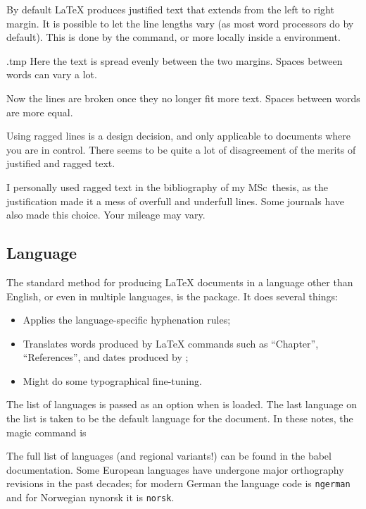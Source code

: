 By default \LaTeX{} produces justified text that extends from the left to right margin.
It is possible to let the line lengths vary (as most word processors do by default).
This is done by the  command,
or more locally inside a  environment.
%
\begin{VerbatimOut}{\jobname.tmp}
Here the text is spread evenly
between the two margins.
Spaces between words can vary a lot.\\

\raggedright

Now the lines are broken
once they no longer fit more text.
Spaces between words are more equal.
\end{VerbatimOut}
\ShowExample
%
Using ragged lines is a design decision,
and only applicable to documents where you are in control.
There seems to be quite a lot of disagreement of the merits of justified and ragged text.

I personally used ragged text in the bibliography of my MSc~thesis,
as the justification made it a mess of overfull and underfull lines.
Some journals have also made this choice.
Your mileage may vary.



%
%
\subsection{Language}

The standard method for producing \LaTeX{} documents in a language other than English,
or even in multiple languages, is the  package.
It does several things:
\begin{itemize}
    \item Applies the language-specific hyphenation rules;
    \item Translates words produced by \LaTeX{} commands such as ``Chapter'', ``References'',
        and dates produced by ;
    \item Might do some typographical fine-tuning.
\end{itemize}

The list of languages is passed as an option when  is loaded.
The last language on the list is taken to be the default language for the document.
In these notes, the magic command is
%
\begin{ExampleCode}
\usepackage[finnish,french,english]{babel}
\end{ExampleCode}
%
The full list of languages (and regional variants!) can be found in the babel documentation.
Some European languages have undergone major orthography revisions in the past decades;
for modern German the language code is \verb|ngerman|
and for Norwegian nynorsk it is \verb|norsk|.


